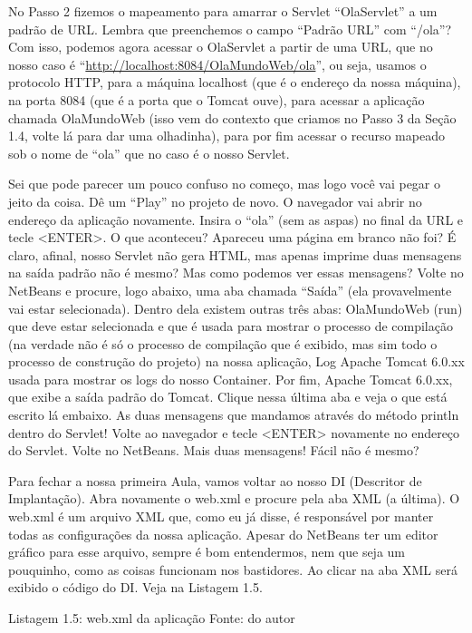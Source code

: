 No Passo 2 fizemos o mapeamento para amarrar o Servlet ``OlaServlet'' a um padrão de URL. Lembra que preenchemos o campo ``Padrão URL'' com ``/ola''? Com isso, podemos agora acessar o OlaServlet a partir de uma URL, que no nosso caso é ``\url{http://localhost:8084/OlaMundoWeb/ola}'', ou seja, usamos o protocolo HTTP, para a máquina localhost (que é o endereço da nossa máquina), na porta 8084 (que é a porta que o Tomcat ouve), para acessar a aplicação chamada OlaMundoWeb (isso vem do contexto que criamos no Passo 3 da Seção 1.4, volte lá para dar uma olhadinha), para por fim acessar o recurso mapeado sob o nome de ``ola'' que no caso é o nosso Servlet. 

Sei que pode parecer um pouco confuso no começo, mas logo você vai pegar o jeito da coisa. Dê um ``Play'' no projeto de novo. O navegador vai abrir no endereço da aplicação novamente. Insira o ``ola'' (sem as aspas) no final da URL e tecle <ENTER>. O que aconteceu? Apareceu uma página em branco não foi? É claro, afinal, nosso Servlet não gera HTML, mas apenas imprime duas mensagens na saída padrão não é mesmo? Mas como podemos ver essas mensagens? Volte no NetBeans e procure, logo abaixo, uma aba chamada ``Saída'' (ela provavelmente vai estar selecionada). Dentro dela existem outras três abas: OlaMundoWeb (run) que deve estar selecionada e que é usada para mostrar o processo de compilação (na verdade não é só o processo de compilação que é exibido, mas sim todo o processo de construção do projeto) na nossa aplicação, Log Apache Tomcat 6.0.xx usada para mostrar os logs do nosso Container. Por fim, Apache Tomcat 6.0.xx, que exibe a saída padrão do Tomcat. Clique nessa última aba e veja o que está escrito lá embaixo. As duas mensagens que mandamos através do método println dentro do Servlet! Volte ao navegador e tecle <ENTER> novamente no endereço do Servlet. Volte no NetBeans. Mais duas mensagens! Fácil não é mesmo?

Para fechar a nossa primeira Aula, vamos voltar ao nosso DI (Descritor de Implantação). Abra novamente o web.xml e procure pela aba XML (a última). O web.xml é um arquivo XML que, como eu já disse, é responsável por manter todas as configurações da nossa aplicação. Apesar do NetBeans ter um editor gráfico para esse arquivo, sempre é bom entendermos, nem que seja um pouquinho, como as coisas funcionam nos bastidores. Ao clicar na aba XML será exibido o código do DI. Veja na Listagem 1.5.

Listagem 1.5: web.xml da aplicação
Fonte: do autor

